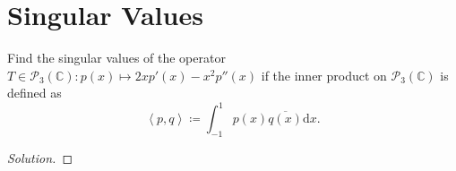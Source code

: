 \documentclass{article}
\newenvironment{solution}{\begin{proof}[Solution]}{\end{proof}}
\newcommand{\CC}{\mathbb{C}}
\newcommand{\innerproduct}[2]{\left\langle{#1}, {#2}\right\rangle}
\begin{document}
\section{Singular Values}
\begin{hw}
	Find the singular values of the operator $T \in \mathscr{P}_{3}(\CC) : p(x) \mapsto 2xp'(x) - x^{2}p''(x)$ if the inner product on $\mathscr{P}_{3}(\CC)$ is defined as
	\begin{equation*}
		\innerproduct{p}{q} \coloneq \int_{-1}^{1} p(x) \overline{q(x)} \mathrm dx.
	\end{equation*}
\end{hw}
\begin{solution}
	\begin{comment}
		To begin with, we will find the matrix representation of $T$. We note the following:
	\begin{enumerate}
		\item $T(1) \mapsto 0$.
		\item $T(x) \mapsto 2x$.
		\item $T(x^{2}) \mapsto 4x^{2} - 2x^{2} = 2x^{2}$.
		\item $T(x^{3}) \mapsto 6x^{3} - 6x^{3} = 0$.
	\end{enumerate}

	So, we have the following matrix representation for $T$:
	\begin{equation*}
		\mathcal{M}(T) = \begin{bmatrix}
			0 & 0 & 0 & 0 \\
			0 & 2 & 0 & 0 \\
			0 & 0 & 2 & 0 \\
			0 & 0 & 0 & 0
		\end{bmatrix}
	\end{equation*}

	To find the adjoint $T^{*}$, we can determine it by finding $T^{*}$ such that $\innerproduct{Tp}{q} = \innerproduct{p}{T^{*}q}$.
	
	First, we see that
	\begin{align*}
		\innerproduct{Tp}{q} &= \int_{-1}^{1} Tp(x)\overline{q(x)}\mathrm dx \\
		&= \int_{-1}^{1} \left(2xp'(x)-x^{2}p''(x)\right)q(x) \mathrm dx \\
		&= \int_{-1}^{1} 2xp'(x)q(x) \mathrm dx - \int_{-1}^{1} x^{2}p''(x)q(x)\mathrm dx \\
		&= 2xp(x)q(x) \big|_{-1}^{1} - \int_{-1}^{1} 2p(x)q'(x) \mathrm dx - x^{2}p'(x)q(x) \big|_{-1}^{1} + \int_{-1}^{1} 2xq'(x)p'(x)\mathrm dx \\
		&= 2xp(x)q(x) \big|_{-1}^{1} - \int_{-1}^{1} p(x)q'(x) \mathrm dx - x^{2}p'(x)q(x) \big|_{-1}^{1} + 2xq'(x)p(x)\big|_{-1}^{1} - \int_{-1}^{1} 2q''(x)p(x)\mathrm dx
	\end{align*}
	

\end{comment}
\end{solution}
\end{document}
